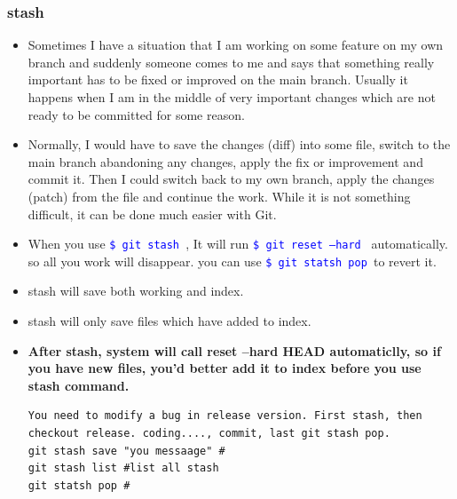 \documentclass[a4paper,11pt,twoside]{book}
\newcommand{\linuxcommand}[1]{\texttt{\textcolor{blue}{\$ #1 \Pisymbol{psy}{191}}}}
\begin{document}
\subsubsection{stash}
\begin{itemize}
		\item Sometimes I have a situation that I am working on some feature on my own branch and suddenly someone comes to me and says that something really important has to be fixed or improved on the main branch. Usually it happens when I am in the middle of very important changes which are not ready to be committed for some reason. 

\item Normally, I would have to save the changes (diff) into some file, switch to the main branch abandoning any changes, apply the fix or improvement and commit it. Then I could switch back to my own branch, apply the changes (patch) from the file and continue the work. While it is not something difficult, it can be done much easier with Git.

\item When you use \linuxcommand{git stash}, It will run \linuxcommand{git reset --hard} automatically. so all you work will disappear. you can use \linuxcommand{git statsh pop }to revert it.
\item stash will save both working and index.
\item stash will only save files which have added to index.
\item \textbf{After stash, system will call reset --hard HEAD automaticlly, so if you have new files, you'd better add it to index before you use stash command.}
\begin{verbatim}
You need to modify a bug in release version. First stash, then checkout release. coding...., commit, last git stash pop.
git stash save "you messaage" #
git stash list #list all stash
git statsh pop #
\end{verbatim}

\end{itemize}
\end{document}
